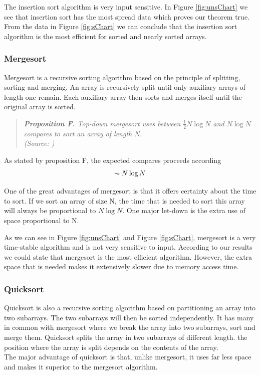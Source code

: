 \documentclass[pdftex,11pt,a4paper,english,titlepage]{article}
\begin{document}
The insertion sort algorithm is very input sensitive. In Figure \ref{fig:unsChart} we see that insertion sort has the most spread data which proves our theorem true.
From the data in Figure \ref{fig:sChart} we can conclude that the insertion sort algorithm is the most efficient for sorted and nearly sorted arrays. 

		\subsubsection{Mergesort}
Mergesort is a recursive sorting algorithm based on the principle of splitting, sorting and merging. An array is recursively split until only auxiliary arrays of length one remain. Each auxiliary array then sorts and merges itself until the original array is sorted.

\begin{quote}
\em \noindent \textbf{Proposition F.} Top-down mergesort uses between $\frac{1}{2}N\log N$ and $N\log N$ compares to sort an array of length N.\\
\tiny (Source: \cite{Sedgewick2011})
\end{quote}

As stated by proposition F, the expected compares proceeds according $$\thicksim N\log N$$

One of the great advantages of mergesort is that it offers certainty about the time to sort. If we sort an array of size N, the time that is needed to sort this array will always be proportional to $N\log N$. One major let-down is the extra use of space proportional to N.

As we can see in Figure \ref{fig:unsChart} and Figure \ref{fig:sChart}, mergesort is a very time-stable algorithm and is not very sensitive to input. According to our results we could state that mergesort is the most efficient algorithm. However, the extra space that is needed makes it extensively slower due to memory access time.

		\subsubsection{Quicksort}\label{sec:quick}
Quicksort is also a recursive sorting algorithm based on partitioning an array into two subarrays. The two subarrays will then be sorted independently. It has many in common with mergesort where we break the array into two subarrays, sort and merge them. Quicksort splits the array in two subarrays of different length. the position where the array is split depends on the contents of the array.\\
The major advantage of quicksort is that, unlike mergesort, it uses far less space and makes it superior to the mergesort algorithm.
\end{document}
